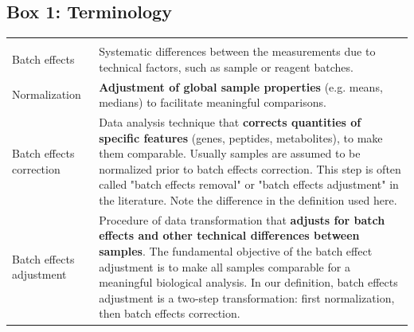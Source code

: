 \documentclass[num-refs]{wiley-article}
\begin{document}
\begin{table}[ht]
\begin{tcolorbox}
	\section*{Box 1: Terminology}
	\label{box:Box1_definitions}
	\begin{tabular}{>{\raggedright}p{2cm}m{10.5cm}}
		\headrow
		\thead{Term} & \thead{Definition} \\
		Batch effects & Systematic differences between the measurements due to technical factors, such as sample or reagent batches.  \\
		Normalization & \textbf{Adjustment of global sample properties} (e.g. means, medians) to facilitate meaningful comparisons. \\
		Batch effects correction & Data analysis technique that \textbf{corrects quantities of specific features} (genes, peptides, metabolites), to make them comparable. Usually samples are assumed to be normalized prior to batch effects correction. This step is often called "batch effects removal" or "batch effects adjustment" in the literature. Note the difference in the definition used here. \\
		Batch effects adjustment & Procedure of data transformation that \textbf{adjusts for batch effects and other technical differences between samples}. The fundamental objective of the batch effect adjustment is to make all samples comparable for a meaningful biological analysis. In our definition, batch effects adjustment is a two-step transformation: first normalization, then batch effects correction. \\
		\hline  %
	\end{tabular}
	
\end{tcolorbox}
\end{table}
\end{document}
